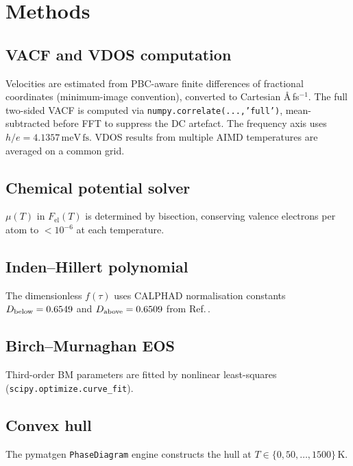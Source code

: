\documentclass[twocolumn,10pt]{article}
\newcommand{\Fel}{F_{\mathrm{el}}}
\begin{document}
\section*{Methods}

\subsection*{VACF and VDOS computation}

Velocities are estimated from PBC-aware finite differences of fractional coordinates
(minimum-image convention), converted to Cartesian \AA\,fs$^{-1}$.
The full two-sided VACF is computed via \texttt{numpy.correlate(...,'full')},
mean-subtracted before FFT to suppress the DC artefact.
The frequency axis uses $h/e = 4.1357\,\mathrm{meV\,fs}$.
VDOS results from multiple AIMD temperatures are averaged on a common grid.

\subsection*{Chemical potential solver}

$\mu(T)$ in $\Fel(T)$ is determined by bisection, conserving valence electrons
per atom to $< 10^{-6}$ at each temperature.

\subsection*{Inden--Hillert polynomial}

The dimensionless $f(\tau)$ uses CALPHAD normalisation constants
$D_{\rm below} = 0.6549$ and $D_{\rm above} = 0.6509$
from Ref.\,.

\subsection*{Birch--Murnaghan EOS}

Third-order BM parameters are fitted by nonlinear least-squares
(\texttt{scipy.optimize.curve\_fit}).

\subsection*{Convex hull}

The pymatgen \texttt{PhaseDiagram} engine\cite{ong2013python} constructs the hull
at $T \in \{0,50,\ldots,1500\}\,\mathrm{K}$.
\end{document}
